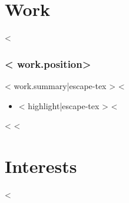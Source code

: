 \documentclass{resume}
\begin{document}
\section{Work}
<%
\subsubsection{<{ work.position}>}
<{ work.summary|escape-tex }>
<%
\begin{itemize}
<%
  \item <{ highlight|escape-tex }>
<%
\end{itemize}
<%
<%
\section{Interests}
<%
\end{document}
